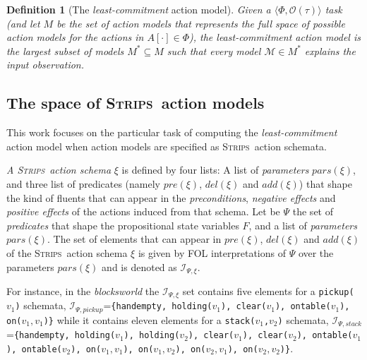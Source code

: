 \documentclass{article}
\newcommand{\tup}[1]{{\langle #1 \rangle}}
\newcommand{\strips}{\textsc{Strips}}
\newtheorem{definition}[theorem]{Definition}
\begin{document}
\begin{definition}[The {\em least-commitment} action model]
Given a $\tup{\Phi,\mathcal{O}(\tau)}$ task (and let $M$ be the set of action models that represents the full space of possible action models for the actions in $A[\cdot]\in \Phi$), the {\em least-commitment} action model is the largest subset of models $M^*\subseteq M$ such that every model $\mathcal{M}\in M^*$ {\em explains} the input observation.
\end{definition}

\subsection{The space of \strips\ action models}
This work focuses on the particular task of computing the {\em least-commitment} action model when action models are specified as \strips\ action schemata.

{\em A \strips\ action schema} $\xi$ is defined by four lists: A list of {\em parameters} $pars(\xi)$, and three list of predicates (namely $pre(\xi)$, $del(\xi)$ and $add(\xi)$) that shape the kind of fluents that can appear in the {\em preconditions}, {\em negative effects} and {\em positive effects} of the actions induced from that schema. Let be $\Psi$ the set of {\em predicates} that shape the propositional state variables $F$, and a list of {\em parameters} $pars(\xi)$. The set of elements that can appear in $pre(\xi)$, $del(\xi)$ and $add(\xi)$ of the \strips\ action schema $\xi$ is given by FOL interpretations of $\Psi$ over the parameters $pars(\xi)$ and is denoted as ${\mathcal I}_{\Psi,\xi}$.

For instance, in the {\em blocksworld} the ${\mathcal I}_{\Psi,\xi}$ set contains five elements for a {\small \tt pickup($v_1$)} schemata, ${\mathcal I}_{\Psi,pickup}$={\small\tt\{handempty, holding($v_1$), clear($v_1$), ontable($v_1$), on($v_1,v_1$)\}} while it contains eleven elements for a {\small \tt stack($v_1$,$v_2$)} schemata, ${\mathcal I}_{\Psi,stack}$={\small\tt\{handempty, holding($v_1$), holding($v_2$), clear($v_1$), clear($v_2$), ontable($v_1$), ontable($v_2$), on($v_1,v_1$), on($v_1,v_2$), on($v_2,v_1$), on($v_2,v_2$)\}}. 
\end{document}
